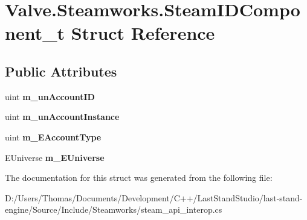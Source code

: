 \hypertarget{structValve_1_1Steamworks_1_1SteamIDComponent__t}{}\section{Valve.\+Steamworks.\+Steam\+I\+D\+Component\+\_\+t Struct Reference}
\label{structValve_1_1Steamworks_1_1SteamIDComponent__t}
\subsection*{Public Attributes}
\begin{DoxyCompactItemize}
\item 
\hypertarget{structValve_1_1Steamworks_1_1SteamIDComponent__t_a0fa9c6a4e6da1e7f071d05aba16d439b}{}uint {\bfseries m\+\_\+un\+Account\+I\+D}\label{structValve_1_1Steamworks_1_1SteamIDComponent__t_a0fa9c6a4e6da1e7f071d05aba16d439b}

\item 
\hypertarget{structValve_1_1Steamworks_1_1SteamIDComponent__t_a5fb146cbc9fbfd951dd06450ab8891c9}{}uint {\bfseries m\+\_\+un\+Account\+Instance}\label{structValve_1_1Steamworks_1_1SteamIDComponent__t_a5fb146cbc9fbfd951dd06450ab8891c9}

\item 
\hypertarget{structValve_1_1Steamworks_1_1SteamIDComponent__t_ad58da28a34031d0beebf0472abb72a69}{}uint {\bfseries m\+\_\+\+E\+Account\+Type}\label{structValve_1_1Steamworks_1_1SteamIDComponent__t_ad58da28a34031d0beebf0472abb72a69}

\item 
\hypertarget{structValve_1_1Steamworks_1_1SteamIDComponent__t_a62c7e4e0b219a8068beaf15f88c1865d}{}E\+Universe {\bfseries m\+\_\+\+E\+Universe}\label{structValve_1_1Steamworks_1_1SteamIDComponent__t_a62c7e4e0b219a8068beaf15f88c1865d}

\end{DoxyCompactItemize}


The documentation for this struct was generated from the following file\+:\begin{DoxyCompactItemize}
\item 
D\+:/\+Users/\+Thomas/\+Documents/\+Development/\+C++/\+Last\+Stand\+Studio/last-\/stand-\/engine/\+Source/\+Include/\+Steamworks/steam\+\_\+api\+\_\+interop.\+cs\end{DoxyCompactItemize}
